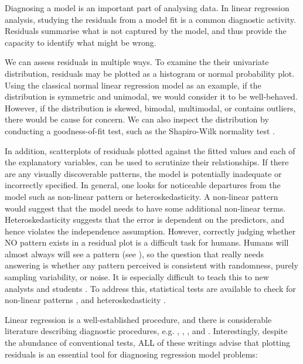 \documentclass[]{interact}
\theoremstyle{plain}%
\theoremstyle{definition}
\theoremstyle{remark}
\begin{document}
Diagnosing a model is an important part of analysing data. In linear
regression analysis, studying the residuals from a model fit is a common
diagnostic activity. Residuals summarise what is not captured by the
model, and thus provide the capacity to identify what might be wrong.

We can assess residuals in multiple ways. To examine the their
univariate distribution, residuals may be plotted as a histogram or
normal probability plot. Using the classical normal linear regression
model as an example, if the distribution is symmetric and unimodal, we
would consider it to be well-behaved. However, if the distribution is
skewed, bimodal, multimodal, or contains outliers, there would be cause
for concern. We can also inspect the distribution by conducting a
goodness-of-fit test, such as the Shapiro-Wilk normality test
\citep{shapiro1965analysis}.

In addition, scatterplots of residuals plotted against the fitted values
and each of the explanatory variables, can be used to scrutinize their
relationships. If there are any visually discoverable patterns, the
model is potentially inadequate or incorrectly specified. In general,
one looks for noticeable departures from the model such as non-linear
pattern or heteroskedasticity. A non-linear pattern would suggest that
the model needs to have some additional non-linear terms.
Heteroskedasticity suggests that the error is dependent on the
predictors, and hence violates the independence assumption. However,
correctly judging whether NO pattern exists in a residual plot is a
difficult task for humans. Humans will almost always will see a pattern
(see \citet{kahneman}), so the question that really needs answering is
whether any pattern perceived is consistent with randomness, purely
sampling variability, or noise. It is especially difficult to teach this
to new analysts and students \citep{loy2021bringing}. To address this,
statistical tests are available to check for non-linear patterns
\citep[e.g.][]{ramsey_tests_1969}, and heteroskedasticity
\citep[e.g.][]{breusch_simple_1979}.

Linear regression is a well-established procedure, and there is
considerable literature describing diagnostic procedures, e.g.
\citet{draper1998applied}, \citet{montgomery1982introduction},
\citet{belsley_regression_1980}, \citet{cook_applied_1999} and
\citet{cook1982residuals}. Interestingly, despite the abundance of
conventional tests, ALL of these writings advise that plotting residuals
is an essential tool for diagnosing regression model problems:
\end{document}
